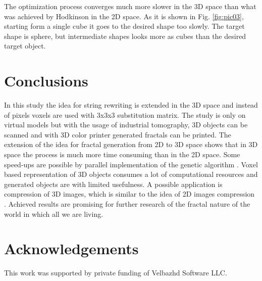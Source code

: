 \documentclass{llncs}
\begin{document}
The optimization process converges much more slower in the 3D space than what was achieved by Hodkinson in the 2D space. As it is shown in Fig. \ref{fig:pic03}, starting form a single cube it goes to the desired shape too slowly. The target shape is sphere, but intermediate shapes looks more as cubes than the desired target object.

\section{Conclusions} \label{Conclusions}

In this study the idea for string rewriting is extended in the 3D space and instead of pixels voxels are used with 3x3x3 substitution matrix. The study is only on virtual models but with the usage of industrial tomography, 3D objects can be scanned and with 3D color printer generated fractals can be printed. The extension of the idea for fractal generation from 2D to 3D space shows that in 3D space the process is much more time consuming than in the 2D space. Some speed-ups are possible by parallel implementation of the genetic algorithm \cite{shonkwiler02}. Voxel based representation of 3D objects consumes a lot of computational resources and generated objects are with limited usefulness. A possible application is compression of 3D images, which is similar to the idea of 2D images compression \cite{vences01,albundi01}. Achieved results are promising for further research of the fractal nature of the world in which all we are living. 

\section*{Acknowledgements}
This work was supported by private funding of Velbazhd Software LLC.
\end{document}
